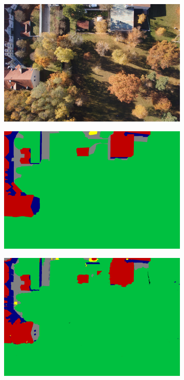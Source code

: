 \begin{figure}[htb]
\begin{subfigure}{0.243\columnwidth}
  \centering
  \includegraphics[width=1\linewidth]{fig/segmentation/DSC00792.JPG}
\end{subfigure}\vspace{1mm}
\begin{subfigure}{0.243\columnwidth}
  \centering
  \includegraphics[width=1\linewidth]{fig/segmentation/DSC00792.png}
\end{subfigure}
\begin{subfigure}{0.243\columnwidth}
  \centering
  \includegraphics[width=1\linewidth]{fig/segmentation/DSC00792_6000_manualcrf.png}

\end{subfigure}
\end{figure}
